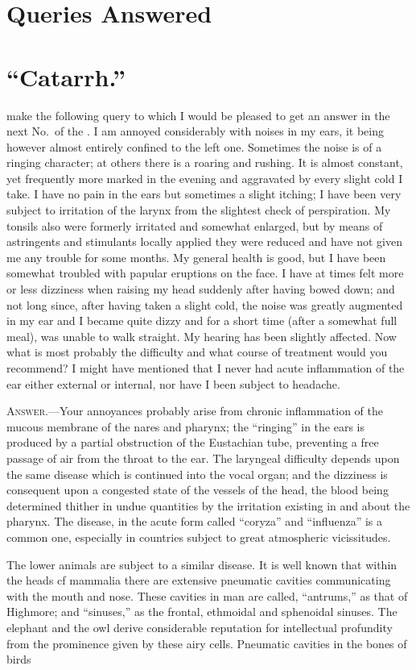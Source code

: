 \section{Queries Answered}

\section{``Catarrh.''}

 make the following query to which I would be pleased to get
an answer in the next No.\ of the . I am annoyed considerably
with noises in my ears, it being however almost entirely confined
to the left one. Sometimes the noise is of a ringing character; at others
there is a roaring and rushing. It is almost constant, yet frequently
more marked in the evening and aggravated by every slight cold I take.
I have no pain in the ears but sometimes a slight itching; I have been
very subject to irritation of the larynx from the slightest check of perspiration.
My tonsils also were formerly irritated and somewhat enlarged,
but by means of astringents and stimulants locally applied they
were reduced and have not given me any trouble for some months. My
general health is good, but I have been somewhat troubled with papular
eruptions on the face. I have at times felt more or less dizziness when
raising my head suddenly after having bowed down; and not long since,
after having taken a slight cold, the noise was greatly augmented in my
ear and I became quite dizzy and for a short time (after a somewhat full
meal), was unable to walk straight. My hearing has been slightly affected.
Now what is most probably the difficulty and what course of treatment
would you recommend? I might have mentioned that I never had acute
inflammation of the ear either external or internal, nor have I been subject
to headache.

\textsc{Answer.}---Your annoyances probably arise from chronic inflammation
of the mucous membrane of the nares and pharynx; the ``ringing'' in the
ears is produced by a partial obstruction of the Eustachian tube, preventing
a free passage of air from the throat to the ear. The laryngeal difficulty
depends upon the same disease which is continued into the vocal
organ; and the dizziness is consequent upon a congested state of the vessels
of the head, the blood being determined thither in undue quantities
by the irritation existing in and about the pharynx. The disease, in the
acute form called ``coryza'' and ``influenza'' is a common one, especially
in countries subject to great atmospheric vicissitudes.

The lower animals are subject to a similar disease. It is well known
that within the heads cf mammalia there are extensive pneumatic cavities
communicating with the mouth and nose. These cavities in man
are called, ``antrums,'' as that of Highmore; and ``sinuses,'' as the frontal,
ethmoidal and sphenoidal sinuses. The elephant and the owl derive
considerable reputation for intellectual profundity from the prominence
given by these airy cells. Pneumatic cavities in the bones of birds\endinput
